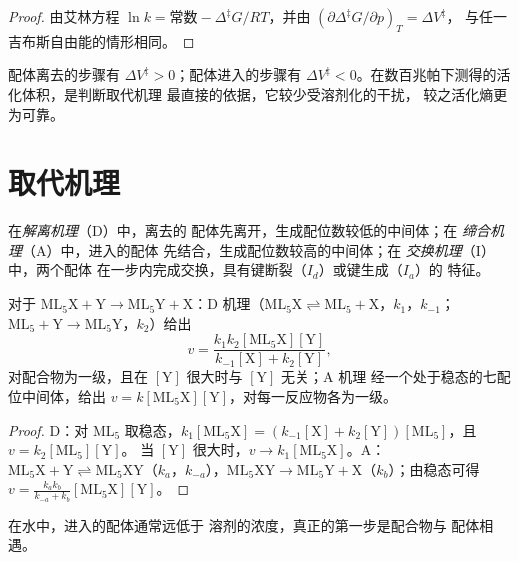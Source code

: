 \begin{proof}
由艾林方程 $\ln k = \text{常数} - \Delta^{\ddagger}G/RT$，并由 $(\partial\Delta^{\ddagger}G/\partial p)_T = \Delta V^{\ddagger}$，
与任一吉布斯自由能的情形相同。
\end{proof}

配体离去的步骤有 $\Delta V^{\ddagger} > 0$；配体进入的步骤有 $\Delta V^{\ddagger}
< 0$。在数百兆帕下测得的活化体积，是判断取代机理
最直接的依据，它较少受溶剂化的干扰，
较之活化熵更为可靠。

\section{取代机理}

\begin{definition}\label{def:b3:complex-mechanisms:mechanisms}
在\emph{解离机理}（D）中，离去的
配体先离开，生成配位数较低的中间体；在
\emph{缔合机理}（A）中，进入的配体
先结合，生成配位数较高的中间体；在
\emph{交换机理}（I）中，两个配体
在一步内完成交换，具有键断裂（$I_d$）或键生成（$I_a$）的
特征。
\end{definition}

\begin{proposition}\label{prop:b3:complex-mechanisms:d-a-laws}
对于 $\mathrm{ML_5X + Y \to ML_5Y + X}$：D 机理（$\mathrm{ML_5X} \rightleftharpoons \mathrm{ML_5} + \mathrm X$，$k_1$，$k_{-1}$；$\mathrm{ML_5} + \mathrm Y
\to \mathrm{ML_5Y}$，$k_2$）给出
\[
  v = \frac{k_1k_2[\mathrm{ML_5X}][\mathrm Y]}{k_{-1}[\mathrm X] + k_2[\mathrm Y]},
\]
对配合物为一级，且在 $[\mathrm Y]$ 很大时与 $[\mathrm Y]$ 无关；A 机理
经一个处于稳态的七配位中间体，给出 $v =
k[\mathrm{ML_5X}][\mathrm Y]$，对每一反应物各为一级。
\end{proposition}

\begin{proof}
D：对 $\mathrm{ML_5}$ 取稳态，$k_1[\mathrm{ML_5X}] = (k_{-1}[\mathrm X] + k_2[\mathrm Y])[\mathrm{ML_5}]$，且 $v = k_2[\mathrm{ML_5}][\mathrm Y]$。
当 $[\mathrm Y]$ 很大时，$v \to k_1[\mathrm{ML_5X}]$。A：$\mathrm{ML_5X} + \mathrm Y \rightleftharpoons \mathrm{ML_5XY}$（$k_a$，$k_{-a}$），$\mathrm{ML_5XY} \to
\mathrm{ML_5Y} + \mathrm X$（$k_b$）；由稳态可得 $v = \frac{k_ak_b}{k_{-a} + k_b}[\mathrm{ML_5X}][\mathrm Y]$。
\end{proof}

在水中，进入的配体通常远低于
溶剂的浓度，真正的第一步是配合物与
配体相遇。

